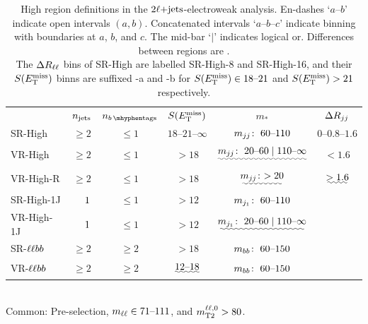 \begin{table}[tp]
\centering
\begin{tabular}{lccccc}
& $n_\mathrm{jets}$
& $\nbtag$
& $S(E_\mathrm{T}^\mathrm{miss})$
& $m_*$
& $\Delta R_{jj}$
\\[1em]
SR-High
& $\geq2$
& $\leq 1$
& $18\textrm{--}21\textrm{--}\infty$
& $m_{jj}\!:~  60\textrm{--}110$
& $0\textrm{--}0.8\textrm{--}1.6$
\\[0.5em]
\: VR-High
& $\geq2$
& $\leq 1$
& $> 18$
& $\uwave{\mjj\!:~  20\textrm{--}60 \mid 110\textrm{--}\infty}$
& $< 1.6$
\\[0.5em]
\: VR-High-R
& $\geq 2$
& $\leq 1$
& $> 18$
& $\uwave{\mjj\!:~  > 20}$
& $\uwave{> 1.6}$
\\[1em]
SR-High-1J
& $\hphantom{\geq}~1$
& $\leq 1$
& $> 12$
& $m_{j_1}\!:~  60\textrm{--}110$
&
\\[0.5em]
\: VR-High-1J
& $\hphantom{\geq}~1$
& $\leq 1$
& $> 12$
& $\uwave{\mjetone\!:~  20\textrm{--}60 \mid 110\textrm{--}\infty}$
&
\\[1em]
SR-$\ell\ell bb$
& $\geq 2$
& $\geq 2$
& $> 18$
& $m_{bb}\!:~  60\textrm{--}150$
&
\\[0.5em]
\: VR-$\ell\ell bb$
& $\geq 2$
& $\geq 2$
& $\uwave{12\textrm{--}18}$
& $m_{bb}\!:~  60\textrm{--}150$
&
\end{tabular}
\\[1em]
Common: Pre-selection,
$m_{\ell\ell} \in 71\textrm{--}111$, and
$m_\mathrm{T2}^{\ell\ell,0} > 80$.
\caption[
High region definitions in the $\twoljets$-electroweak analysis
]{%
High region definitions in the $\twoljets$-electroweak analysis.
En-dashes `$a\textrm{--}b$' indicate open intervals $(a, b)$.
Concatenated intervals `$a\textrm{--}b\textrm{--}c$' indicate binning
with boundaries at $a$, $b$, and $c$.
The mid-bar `$\mid$' indicates logical or.
Differences between regions are .
\\[0.5em]
The $\Delta R_{\ell\ell}$ bins of SR-High are labelled SR-High-8 and SR-High-16, and their
$S(E_\mathrm{T}^\mathrm{miss})$ binns are suffixed -a and -b for $S(E_\mathrm{T}^\mathrm{miss}) \in 18\textrm{--}21$
and $S(E_\mathrm{T}^\mathrm{miss}) > 21$ respectively.
}
\label{tab:2ljets_high}
\end{table}

